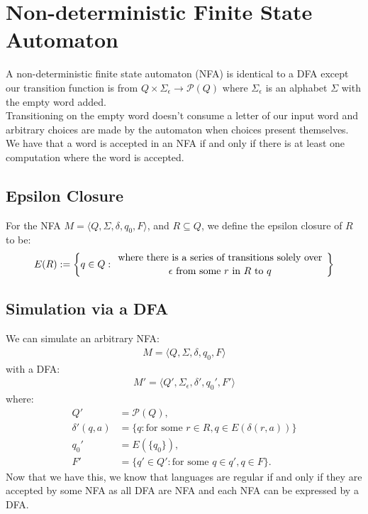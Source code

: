 \section{Non-deterministic Finite State Automaton}

A non-deterministic finite state automaton (NFA) is identical
to a DFA except our transition function is from 
$Q \times \Sigma_\epsilon \to \mathcal{P}(Q)$ where
$\Sigma_\epsilon$ is an alphabet $\Sigma$ with the empty word
added.
\\[\baselineskip]
Transitioning on the empty word doesn't consume a letter of our
input word and arbitrary choices are made by the automaton when
choices present themselves. We have that a word is accepted
in an NFA if and only if there is at least one computation where 
the word is accepted.

\subsection{Epsilon Closure}

For the NFA $M =  \langle Q, \Sigma, \delta, q_0, F \rangle$, 
and $R \subseteq Q$, we define the epsilon closure
of $R$ to be: \begin{gather*}
    E(R) := \left\{
        q \in Q : \bfrac{
        \text{ where there is a series of 
        transitions solely over }
    }{
        \epsilon \text{ from some } r \text{ in } 
        R \text{ to } q
    }\right\}
\end{gather*}

\subsection{Simulation via a DFA}

We can simulate an arbitrary NFA: \begin{gather*}
    M =  \langle Q, \Sigma, \delta, q_0, F \rangle
\end{gather*}
with a DFA: \begin{gather*}
    M' = \langle Q', \Sigma_\epsilon, \delta', q_0', F' \rangle
\end{gather*} where: \begin{align*}
    Q'   &= \mathcal{P}(Q), \\
    \delta'(q, a) &= \{q : \text{for some }
        r \in R, q \in E(\delta(r, a))
    \} \\
    q_0' &= E(\{q_0\}), \\
    F'   &= \{q' \in Q' : \text{for some } q \in q', q \in F\}.
\end{align*} Now that we have this, we know that languages are
regular if and only if they are accepted by some NFA as
all DFA are NFA and each NFA can be expressed by a DFA.